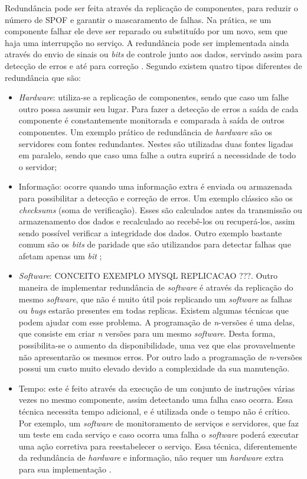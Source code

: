 Redundância pode ser feita através da replicação de componentes, para reduzir o número de \ac{SPOF} e garantir o mascaramento de falhas.
Na prática, se um componente falhar ele deve ser reparado ou substituído por um novo, sem que haja uma interrupção no serviço.
A redundância pode ser implementada ainda através do envio de sinais ou \textit{bits} de controle junto aos dados, servindo assim para 
detecção de erros e até para correção \cite{weber2002}. Segundo \cite{norvag2000} existem quatro tipos diferentes de redundância que são:
\begin{itemize}
 \item \textit{Hardware}: utiliza-se a replicação de componentes, sendo que caso um falhe outro possa assumir seu lugar. 
 Para fazer a detecção de erros a saída de cada componente é constantemente monitorada e comparada à saída de outros componentes.
 Um exemplo prático de redundância de \textit{hardware} são os servidores com fontes redundantes. Nestes são utilizadas duas fontes ligadas 
 em paralelo, sendo que caso uma falhe a outra suprirá a necessidade de todo o servidor;
 \item Informação: ocorre quando uma informação extra é enviada ou armazenada para possibilitar a detecção e correção de erros.
 Um exemplo clássico são os \textit{checksums} (soma de verificação). Esses são calculados antes da transmissão ou armazenamento dos dados 
 e recalculado ao recebê-los ou recuperá-los, assim sendo possível verificar a integridade dos dados. Outro exemplo bastante comum são os 
 \textit{bits} de paridade que são utilizandos para detectar falhas que afetam apenas um \textit{bit} \cite{weber2002};
 \item \textit{Software}: CONCEITO EXEMPLO MYSQL REPLICACAO ???. 
 Outro maneira de implementar redundância de \textit{software} é através da replicação do mesmo \textit{software}, que não é muito útil 
 pois replicando um \textit{software} as falhas ou \textit{bugs} estarão presentes em todas replicas. Existem algumas técnicas que podem 
 ajudar com esse problema. A programação de \textit{n}-versões é uma delas, que consiste em criar \textit{n} versões para um mesmo 
 \textit{software}. Desta forma, possibilita-se o aumento da disponibilidade, uma vez que elas provavelmente não apresentarão os mesmos 
 erros. Por outro lado a programação de \textit{n}-versões possui um custo muito elevado devido a complexidade da sua manutenção.
 \item Tempo: este é feito através da execução de um conjunto de instruções várias vezes no mesmo componente, assim detectando uma falha caso 
 ocorra. Essa técnica necessita tempo adicional, e é utilizada onde o tempo não é crítico. Por exemplo, um \textit{software} de monitoramento 
 de serviços e servidores, que faz um teste em cada serviço e caso ocorra uma falha o \textit{software} poderá executar uma ação corretiva para 
 reestabelecer o serviço. Essa técnica, diferentemente da redundância de \textit{hardware} e informação, não requer um \textit{hardware} 
 extra para sua implementação \cite{costa2009}.
\end{itemize}

